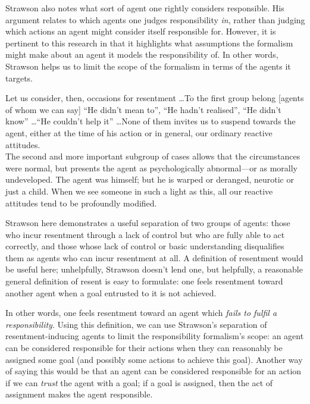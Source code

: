 Strawson also notes what sort of agent one rightly considers responsible. His argument relates to which agents one judges responsibility \emph{in}, rather than judging which actions an agent might consider itself responsible for. However, it is pertinent to this research in that it highlights what assumptions the formalism might make about an agent it models the responsibility of. In other words, Strawson helps us to limit the scope of the formalism in terms of the agents it targets.\par

\begin{displayquote}
    Let us consider, then, occasions for resentment \ldots{}To the first group belong [agents of whom we can say] ``He didn't mean to'', ``He hadn't realised'', ``He didn't know'' \ldots{}``He couldn't help it'' \ldots{}None of them invites us to suspend towards the agent, either at the time of his action or in general, our ordinary reactive attitudes.\\
    The second and more important subgroup of cases allows that the circumstances were normal, but presents the agent as psychologically abnormal—or as morally undeveloped. The agent was himself; but he is warped or deranged, neurotic or just a child. When we see someone in such a light as this, all our reactive attitudes tend to be profoundly modified.\\
\end{displayquote}\cite{strawson}

Strawson here demonstrates a useful separation of two groups of agents: those who incur resentment through a lack of control but who are fully able to act correctly, and those whose lack of control or basic understanding disqualifies them as agents who can incur resentment at all. A definition of resentment would be useful here; unhelpfully, Strawson doesn't lend one, but helpfully, a reasonable general definition of resent is easy to formulate: one feels resentment toward another agent when a goal entrusted to it is not achieved.\par

In other words, one feels resentment toward an agent which \emph{fails to fulfil a responsibility}. Using this definition, we can use Strawson's separation of resentment-inducing agents to limit the responsibility formalism's scope: an agent can be considered responsible for their actions when they can reasonably be assigned some goal (and possibly some actions to achieve this goal). Another way of saying this would be that an agent can be considered responsible for an action if we can \emph{trust} the agent with a goal; if a goal is assigned, then the act of assignment makes the agent responsible.\par

